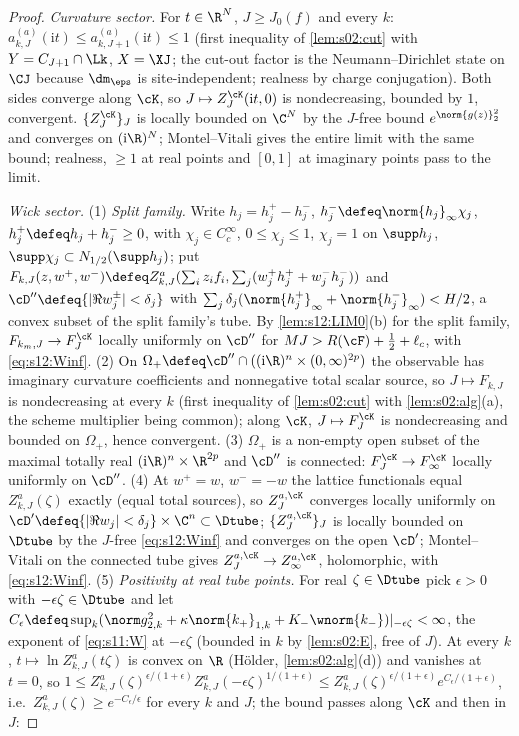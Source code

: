 \begin{proof}
\emph{Curvature sector.} For $t\in\R^N$, $J\ge J_0(f)$ and every $k$: $a^{(a)}_{k,J}(\mathrm it)\le a^{(a)}_{k,J+1}(\mathrm it)\le1$ (first inequality of \cref{lem:s02:cut} with $Y=C_{J+1}\cap\Lk$, $X=\XJ$; the cut-out factor is the Neumann--Dirichlet state on $\CJ$ because $\dm_\eps$ is site-independent; realness by charge conjugation). Both sides converge along $\cK$, so $J\mapsto Z^{\cK}_J(\mathrm it,0)$ is nondecreasing, bounded by $1$, convergent. $\{Z^{\cK}_J\}_J$ is locally bounded on $\C^N$ by the $J$-free bound $e^{\norm{g(z)}_2^2}$ and converges on $(\mathrm i\R)^N$; Montel--Vitali gives the entire limit with the same bound; realness, $\ge1$ at real points and $[0,1]$ at imaginary points pass to the limit.

\emph{Wick sector.} (1) \emph{Split family.} Write $h_j=h_j^+-h_j^-$, $h_j^-\defeq\norm{h_j}_\infty\chi_j$, $h^+_j\defeq h_j+h^-_j\ge0$, with $\chi_j\in C^\infty_c$, $0\le\chi_j\le1$, $\chi_j=1$ on $\supp h_j$, $\supp\chi_j\subset N_{1/2}(\supp h_j)$; put $F_{k,J}(z,w^+,w^-)\defeq Z^a_{k,J}(\sum_iz_if_i,\sum_j(w^+_jh^+_j+w^-_jh^-_j))$ and $\cD''\defeq\{|\Re w^\pm_j|<\delta_j\}$ with $\sum_j\delta_j(\norm{h^+_j}_\infty+\norm{h^-_j}_\infty)<H/2$, a convex subset of the split family's tube. By \cref{lem:s12:LIM0}(b) for the split family, $F_{k_m,J}\to F^{\cK}_J$ locally uniformly on $\cD''$ for $MJ>R(\cF)+\frac12+\ell_c$, with \eqref{eq:s12:Winf}. (2) On $\Omega_+\defeq\cD''\cap((\mathrm i\R)^n\times(0,\infty)^{2p})$ the observable has imaginary curvature coefficients and nonnegative total scalar source, so $J\mapsto F_{k,J}$ is nondecreasing at every $k$ (first inequality of \cref{lem:s02:cut} with \cref{lem:s02:alg}(a), the scheme multiplier being common); along $\cK$, $J\mapsto F^{\cK}_J$ is nondecreasing and bounded on $\Omega_+$, hence convergent. (3) $\Omega_+$ is a non-empty open subset of the maximal totally real $(\mathrm i\R)^n\times\R^{2p}$ and $\cD''$ is connected: $F^{\cK}_J\to F^{\cK}_\infty$ locally uniformly on $\cD''$. (4) At $w^+=w$, $w^-=-w$ the lattice functionals equal $Z^a_{k,J}(\zeta)$ exactly (equal total sources), so $Z^{a,\cK}_J$ converges locally uniformly on $\cD'\defeq\{|\Re w_j|<\delta_j\}\times\C^n\subset\Dtube$; $\{Z^{a,\cK}_J\}_J$ is locally bounded on $\Dtube$ by the $J$-free \eqref{eq:s12:Winf} and converges on the open $\cD'$; Montel--Vitali on the connected tube gives $Z^{a,\cK}_J\to Z^{a,\cK}_\infty$, holomorphic, with \eqref{eq:s12:Winf}. (5) \emph{Positivity at real tube points.} For real $\zeta\in\Dtube$ pick $\epsilon>0$ with $-\epsilon\zeta\in\Dtube$ and let $C_\epsilon\defeq\sup_k(\norm g^2_{2,k}+\kappa\norm{k_+}_{1,k}+K_-\wnorm{k_-})|_{-\epsilon\zeta}<\infty$, the exponent of \eqref{eq:s11:W} at $-\epsilon\zeta$ (bounded in $k$ by \cref{lem:s02:E}, free of $J$). At every $k$, $t\mapsto\ln Z^a_{k,J}(t\zeta)$ is convex on $\R$ (H\"older, \cref{lem:s02:alg}(d)) and vanishes at $t=0$, so $1\le Z^a_{k,J}(\zeta)^{\epsilon/(1+\epsilon)}Z^a_{k,J}(-\epsilon\zeta)^{1/(1+\epsilon)}\le Z^a_{k,J}(\zeta)^{\epsilon/(1+\epsilon)}e^{C_\epsilon/(1+\epsilon)}$, i.e.\ $Z^a_{k,J}(\zeta)\ge e^{-C_\epsilon/\epsilon}$ for every $k$ and $J$; the bound passes along $\cK$ and then in $J$: 
\end{proof}
